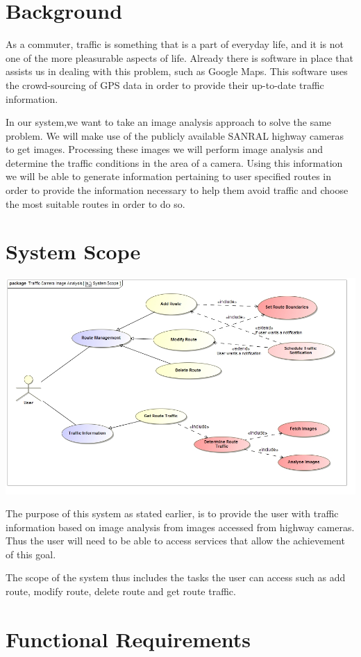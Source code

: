 \documentclass[a4paper,12pt]{article}
\begin{document}
\section{Background}
As a commuter, traffic is something that is a part of everyday life, and it is not one of the more pleasurable aspects of life. Already there is software in place that assists us in dealing with this problem, such as Google Maps. This software uses the crowd-sourcing of GPS data in order to provide their up-to-date traffic information.

In our system,we want to take an image analysis approach to solve the same problem. We will make use of the publicly available SANRAL highway cameras to get images. Processing these images we will perform image analysis and determine the traffic conditions in the area of a camera. Using this information we will be able to generate information pertaining to user specified routes in order to provide the information necessary to help them avoid traffic and choose the most suitable routes in order to do so.
\section{System Scope}
\includegraphics[width=\textwidth]{images/System_Scope.jpg}

The purpose of this system as stated earlier, is to provide the user with traffic information based on image analysis from images accessed from highway cameras. Thus the user will need to be able to access services that allow the achievement of this goal.

The scope of the system thus includes the tasks the user can access such as add route, modify route, delete route and get route traffic.
\section{Functional Requirements}
\end{document}
